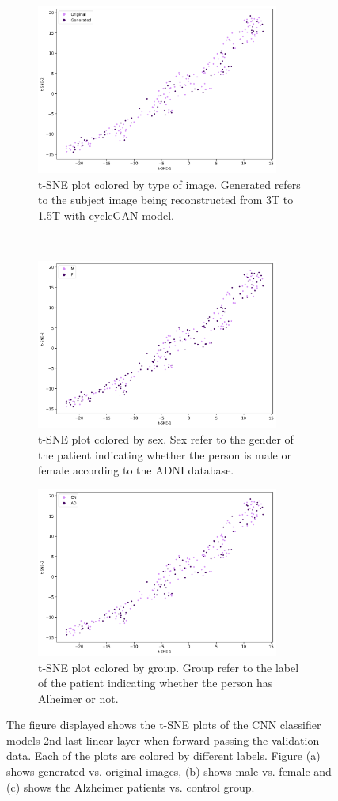 \documentclass[12pt, fleqn, titlepage]{article}
\newcommand{\1}[1]{\mathds{1}\left[#1\right]}
\begin{document}
\begin{figure}[H]
	\centering
	\begin{subfigure}[t]{0.59\textwidth}
		\centering
		\includegraphics[height=2.2in]{imgs/classifier/with_generated_imgs_tsne_type}%
		\caption{t-SNE plot colored by type of image. Generated refers to the subject image being reconstructed from 3T to 1.5T with cycleGAN model.}
	\end{subfigure}%
	~
	\begin{subfigure}[t]{0.5\textwidth}
		\centering
		\includegraphics[height=2.2in]{imgs/classifier/with_generated_imgs_tsne_sex}%
		\caption{t-SNE plot colored by sex. Sex refer to the gender of the patient indicating whether the person is male or female according to the ADNI database.}	
	\end{subfigure}
	\begin{subfigure}[t]{0.5\textwidth}
	\centering
	\includegraphics[height=2.2in]{imgs/classifier/with_generated_imgs_tsne_group}%
	\caption{t-SNE plot colored by group. Group refer to the label of the patient indicating whether the person has Alheimer or not.}
	\end{subfigure}
	\caption{The figure displayed shows the t-SNE plots of the CNN classifier models 2nd last linear layer when forward passing the validation data. Each of the plots are colored by different labels. Figure (a) shows generated vs. original images, (b) shows male vs. female and (c) shows the Alzheimer patients vs. control group. }
		\label{fig:tsne_gen}
\end{figure}
\end{document}
